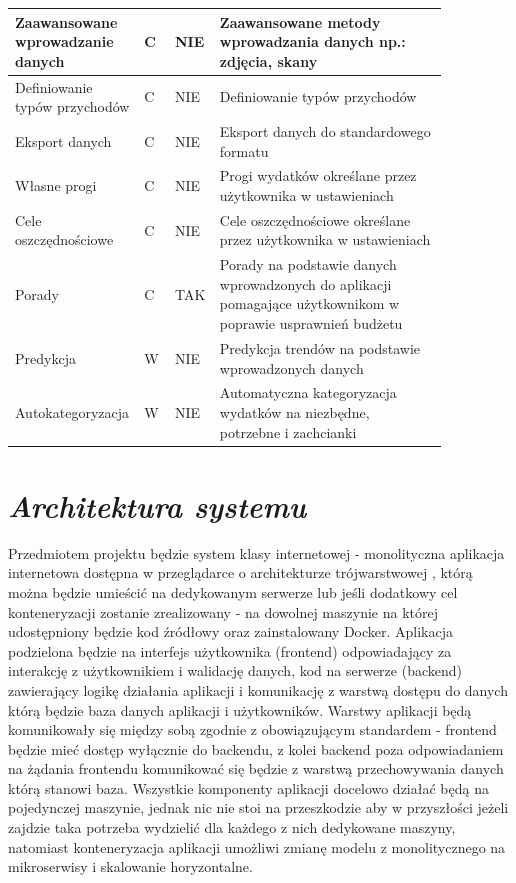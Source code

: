\documentclass[a4paper,10pt, twoside]{report}
\newcommand{\customstylesection}[1]{\textbf{\textit{#1}}}
\begin{document}
\begin{large}
\begin{table}[H]
\begin{tabular}{|p{0.2\linewidth}|p{0.07\linewidth}|p{0.07\linewidth}|p{0.52\linewidth}|}
    \hline
    {Zaawansowane wprowadzanie danych} & {C} & {NIE} & {Zaawansowane metody wprowadzania danych np.: zdjęcia, skany}\\
    \hline
    {Definiowanie typów przychodów} & {C} & {NIE} & {Definiowanie typów przychodów}\\
    \hline
    {Eksport danych} & {C} & {NIE} & {Eksport danych do standardowego formatu}\\
    \hline
    {Własne progi} & {C} & {NIE} & {Progi wydatków określane przez użytkownika w ustawieniach}\\
    \hline
    {Cele oszczędnościowe} & {C} & {NIE} & {Cele oszczędnościowe określane przez użytkownika w ustawieniach}\\
    \hline
    {Porady} & {C} & {TAK} & {Porady na podstawie danych wprowadzonych do aplikacji 
    pomagające użytkownikom w poprawie usprawnień budżetu}\\
    \hline
    {Predykcja} & {W} & {NIE} & {Predykcja trendów na podstawie wprowadzonych danych}\\
    \hline
    {Autokategoryzacja} & {W} & {NIE} & {Automatyczna kategoryzacja wydatków na niezbędne, potrzebne i zachcianki}\\
    \hline
    \end{tabular}
\end{table}

\section{\customstylesection{Architektura systemu}}
{Przedmiotem projektu będzie system klasy internetowej - monolityczna aplikacja 
internetowa dostępna w przeglądarce o architekturze trójwarstwowej 
\cite{wzorceprojektowe}, którą można będzie umieścić na dedykowanym serwerze lub
 jeśli dodatkowy cel konteneryzacji zostanie zrealizowany - na dowolnej maszynie
 na której udostępniony będzie kod źródłowy oraz zainstalowany Docker. Aplikacja
 podzielona będzie na interfejs użytkownika (frontend) odpowiadający za 
interakcję z użytkownikiem i walidację danych, kod na serwerze (backend) 
zawierający logikę działania aplikacji i komunikację z warstwą dostępu do danych
 którą będzie baza danych aplikacji i użytkowników. Warstwy aplikacji będą 
komunikowały się między sobą zgodnie z obowiązującym standardem - frontend 
będzie mieć dostęp wyłącznie do backendu, z kolei backend poza odpowiadaniem na 
żądania frontendu komunikować się będzie z warstwą przechowywania danych którą 
stanowi baza. Wszystkie komponenty aplikacji docelowo działać będą na 
pojedynczej maszynie, jednak nic nie stoi na przeszkodzie aby w przyszłości 
jeżeli zajdzie taka potrzeba wydzielić dla każdego z nich dedykowane maszyny, 
natomiast konteneryzacja aplikacji umożliwi zmianę modelu z monolitycznego na 
mikroserwisy i skalowanie horyzontalne.}


\end{large}
\end{document}
